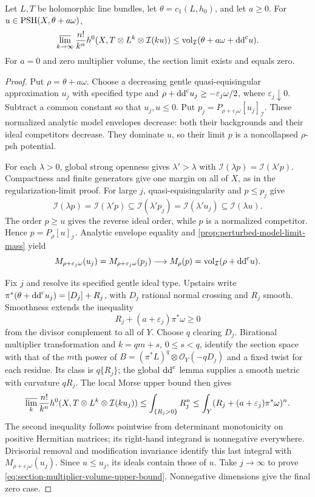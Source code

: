 \begin{proposition}\label{prop:section-multiplier-volume-upper-bound}
Let $L,T$ be holomorphic line bundles, let $\theta=c_1(L,h_0)$, and let $a\geq0$. For $u\in\mathrm{PSH}(X,\theta+a\omega)$,
\begin{equation}\label{eq:section-multiplier-volume-upper-bound}
 \varlimsup_{k\to\infty}\frac{n!}{k^n}
 h^0(X,T\otimes L^k\otimes\mathcal I(ku))
 \leq\operatorname{vol}_{\mathcal I}(\theta+a\omega+\mathrm{dd}^{\mathrm{c}} u).
\end{equation}
For $a=0$ and zero multiplier volume, the section limit exists and equals zero.
\end{proposition}
\begin{proof}
Put $\rho=\theta+a\omega$. Choose a decreasing gentle quasi-equisingular approximation $u_j$ with specified type and $\rho+\mathrm{dd}^{\mathrm{c}} u_j\geq-\varepsilon_j\omega/2$, where $\varepsilon_j\downarrow0$. Subtract a common constant so that $u_j,u\leq0$. Put $p_j=P_{\rho+\varepsilon_j\omega}[u_j]_{\mathcal I}$. These normalized analytic model envelopes decrease: both their backgrounds and their ideal competitors decrease. They dominate $u$, so their limit $p$ is a noncollapsed $\rho$-psh potential.

For each $\lambda>0$, global strong openness gives $\lambda'>\lambda$ with $\mathcal I(\lambda p)=\mathcal I(\lambda'p)$. Compactness and finite generators give one margin on all of $X$, as in the regularization-limit proof. For large $j$, quasi-equisingularity and $p\leq p_j$ give
\[
 \mathcal I(\lambda p)=\mathcal I(\lambda'p)
   \subseteq\mathcal I(\lambda'p_j)
   =\mathcal I(\lambda'u_j)\subseteq\mathcal I(\lambda u).
\]
The order $p\geq u$ gives the reverse ideal order, while $p$ is a normalized competitor. Hence $p=P_\rho[u]_{\mathcal I}$. Analytic envelope equality and \cref{prop:perturbed-model-limit-mass} yield
\[
 M_{\rho+\varepsilon_j\omega}(u_j)
   =M_{\rho+\varepsilon_j\omega}(p_j)
   \longrightarrow M_\rho(p)
   =\operatorname{vol}_{\mathcal I}(\rho+\mathrm{dd}^{\mathrm{c}} u).
\]

Fix $j$ and resolve its specified gentle ideal type. Upstairs write
$\pi^*(\theta+\mathrm{dd}^{\mathrm{c}} u_j)=[D_j]+R_j$, with $D_j$ rational normal crossing and $R_j$ smooth. Smoothness extends the inequality
\[
 R_j+(a+\varepsilon_j)\pi^*\omega\geq0
\]
from the divisor complement to all of $Y$. Choose $q$ clearing $D_j$. Birational multiplier transformation and $k=qm+s$, $0\leq s<q$, identify the section space with that of the $m$th power of
$B=(\pi^*L)^q\otimes\mathcal O_Y(-qD_j)$ and a fixed twist for each residue. Its class is $q\{R_j\}$; the global $\mathrm{dd}^{\mathrm{c}}$ lemma supplies a smooth metric with curvature $qR_j$. The local Morse upper bound then gives
\[
 \varlimsup_k\frac{n!}{k^n}
 h^0(X,T\otimes L^k\otimes\mathcal I(ku_j))
 \leq\int_{\{R_j>0\}}R_j^n
 \leq\int_Y(R_j+(a+\varepsilon_j)\pi^*\omega)^n.
\]
The second inequality follows pointwise from determinant monotonicity on positive Hermitian matrices; its right-hand integrand is nonnegative everywhere. Divisorial removal and modification invariance identify this last integral with $M_{\rho+\varepsilon_j\omega}(u_j)$. Since $u\leq u_j$, its ideals contain those of $u$. Take $j\to\infty$ to prove \eqref{eq:section-multiplier-volume-upper-bound}. Nonnegative dimensions give the final zero case.
\end{proof}
